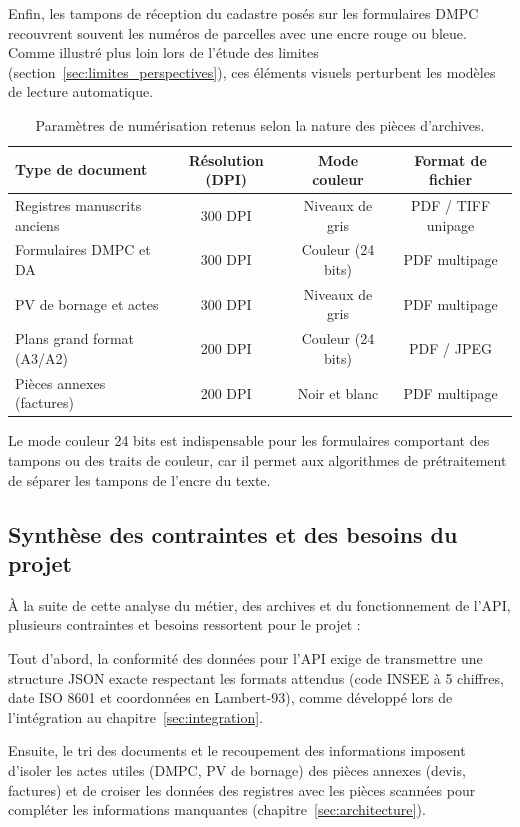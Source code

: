 Enfin, les tampons de réception du cadastre posés sur les formulaires DMPC recouvrent souvent les numéros de parcelles avec une encre rouge ou bleue. Comme illustré plus loin lors de l'étude des limites (section~\ref{sec:limites_perspectives}), ces éléments visuels perturbent les modèles de lecture automatique.


\begin{table}[H]
  \centering
  \caption{Paramètres de numérisation retenus selon la nature des pièces d'archives.}
  \label{tab:param_numerisation}
  \small
  \begin{tabular}{p{4.5cm} c c c}
    \toprule
    \textbf{Type de document} & \textbf{Résolution (DPI)} & \textbf{Mode couleur} & \textbf{Format de fichier} \\
    \midrule
    Registres manuscrits anciens & 300 DPI & Niveaux de gris & PDF / TIFF unipage \\
    Formulaires DMPC et DA & 300 DPI & Couleur (24 bits) & PDF multipage \\
    PV de bornage et actes & 300 DPI & Niveaux de gris & PDF multipage \\
    Plans grand format (A3/A2) & 200 DPI & Couleur (24 bits) & PDF / JPEG \\
    Pièces annexes (factures) & 200 DPI & Noir et blanc & PDF multipage \\
    \bottomrule
  \end{tabular}
\end{table}

Le mode couleur 24 bits est indispensable pour les formulaires comportant des tampons ou des traits de couleur, car il permet aux algorithmes de prétraitement de séparer les tampons de l'encre du texte.


\subsection{Synthèse des contraintes et des besoins du projet}


À la suite de cette analyse du métier, des archives et du fonctionnement de l'API, plusieurs contraintes et besoins ressortent pour le projet :

Tout d'abord, la conformité des données pour l'API exige de transmettre une structure JSON exacte respectant les formats attendus (code INSEE à 5 chiffres, date ISO 8601 et coordonnées en Lambert-93), comme développé lors de l'intégration au chapitre~\ref{sec:integration}.

Ensuite, le tri des documents et le recoupement des informations imposent d'isoler les actes utiles (DMPC, PV de bornage) des pièces annexes (devis, factures) et de croiser les données des registres avec les pièces scannées pour compléter les informations manquantes (chapitre~\ref{sec:architecture}).

